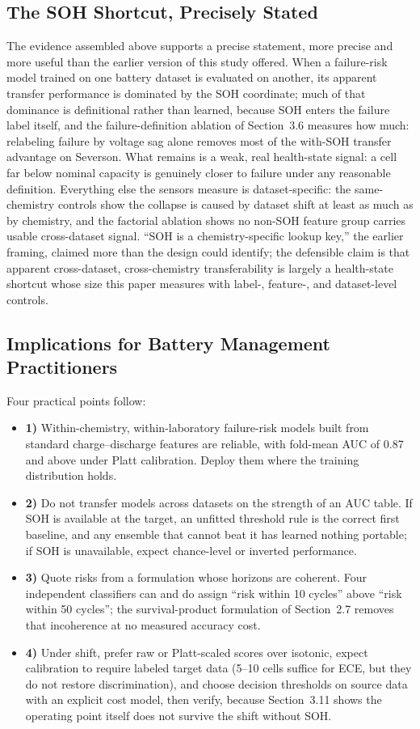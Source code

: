 \documentclass[IJPHM, 2014, 00]{PHMSociety}
\begin{document}
\subsection{The SOH Shortcut, Precisely Stated}
The evidence assembled above supports a precise statement, more precise and more useful than the earlier version of this study offered. When a failure-risk model trained on one battery dataset is evaluated on another, its apparent transfer performance is dominated by the SOH coordinate; much of that dominance is definitional rather than learned, because SOH enters the failure label itself, and the failure-definition ablation of Section~3.6 measures how much: relabeling failure by voltage sag alone removes most of the with-SOH transfer advantage on Severson. What remains is a weak, real health-state signal: a cell far below nominal capacity is genuinely closer to failure under any reasonable definition. Everything else the sensors measure is dataset-specific: the same-chemistry controls show the collapse is caused by dataset shift at least as much as by chemistry, and the factorial ablation shows no non-SOH feature group carries usable cross-dataset signal. ``SOH is a chemistry-specific lookup key,'' the earlier framing, claimed more than the design could identify; the defensible claim is that apparent cross-dataset, cross-chemistry transferability is largely a health-state shortcut whose size this paper measures with label-, feature-, and dataset-level controls.

\subsection{Implications for Battery Management Practitioners}
Four practical points follow:
\begin{itemize}
\item \textbf{1)} Within-chemistry, within-laboratory failure-risk models built from standard charge--discharge features are reliable, with fold-mean AUC of 0.87 and above under Platt calibration. Deploy them where the training distribution holds.
\item \textbf{2)} Do not transfer models across datasets on the strength of an AUC table. If SOH is available at the target, an unfitted threshold rule is the correct first baseline, and any ensemble that cannot beat it has learned nothing portable; if SOH is unavailable, expect chance-level or inverted performance.
\item \textbf{3)} Quote risks from a formulation whose horizons are coherent. Four independent classifiers can and do assign ``risk within 10 cycles'' above ``risk within 50 cycles''; the survival-product formulation of Section~2.7 removes that incoherence at no measured accuracy cost.
\item \textbf{4)} Under shift, prefer raw or Platt-scaled scores over isotonic, expect calibration to require labeled target data (5--10 cells suffice for ECE, but they do not restore discrimination), and choose decision thresholds on source data with an explicit cost model, then verify, because Section~3.11 shows the operating point itself does not survive the shift without SOH.
\end{itemize}
\end{document}
